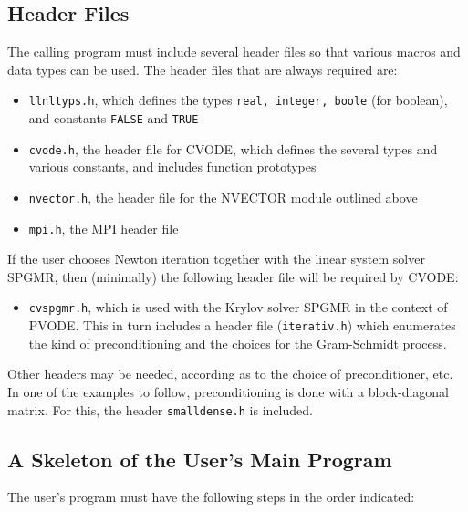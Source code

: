 \subsection{Header Files}

The calling program must include several header files so that various macros
and data types can be used. The header files that are always required are:

\begin{itemize}
\item  {\tt llnltyps.h}, which defines the types {\tt real, integer, boole}
(for boolean), and constants {\tt FALSE} and {\tt TRUE}

\item  {\tt cvode.h}, the header file for CVODE, which defines the several
types and various constants, and includes function prototypes

\item {\tt nvector.h}, the header file for the NVECTOR module outlined
above

\item  {\tt mpi.h}, the MPI header file
\end{itemize}

If the user chooses Newton iteration together with the linear system solver
SPGMR, then (minimally) the following header file will be required by CVODE:

\begin{itemize}
\item  {\tt cvspgmr.h}, which is used with the Krylov solver SPGMR in the
context of PVODE. This in turn includes a header file ({\tt iterativ.h})
which enumerates the kind of preconditioning and the choices for the
Gram-Schmidt process.
\end{itemize}
Other headers may be needed, according as to the choice of
preconditioner, etc. In one of the examples to follow, preconditioning
is done with a block-diagonal matrix. For this, the header
{\tt smalldense.h} is included.

\subsection{A Skeleton of the User's Main Program}

The user's program must have the following steps in the order indicated:

